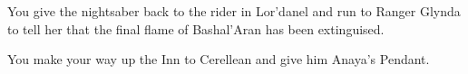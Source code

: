 
You give the nightsaber back to the rider in Lor'danel and run to Ranger Glynda to tell her that the final flame of Bashal'Aran has been extinguised.


You make your way up the Inn to Cerellean and give him Anaya's Pendant.


